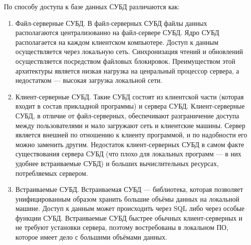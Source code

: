 \documentclass[12pt,a4paper,oneside]{article} %
\begin{document}
По способу доступа к базе данных СУБД различаются как:
\begin{enumerate}
\item  Файл-серверные СУБД. В файл-серверных СУБД файлы данных \linebreak
располагаются централизованно на файл-сервере СУБД. Ядро СУБД \linebreak
располагается на каждом клиентском компьютере. Доступ к данным \linebreak
осуществляется через локальную сеть. Синхронизация чтений и \linebreak
обновлений осуществляется посредством файловых блокировок. \linebreak
Преимуществом этой архитектуры является низкая нагрузка на \linebreak
ценральный процессор сервера, а недостатком — высокая загрузка \linebreak
локальной сети.

\item Клиент-серверные СУБД. Такие СУБД состоят из клиентской части \linebreak
(которая входит в состав прикладной программы) и сервера СУБД. \linebreak
Клиент-серверные СУБД, в отличие от файл-серверных, обеспечивают \linebreak
разграничение доступа между пользователями и мало загружают сеть \linebreak
и клиентские машины. Сервер является внешней по отношению к \linebreak
клиенту программой, и по надобности его можно заменить другим. \linebreak
Недостаток клиент-серверных СУБД в самом факте существования \linebreak
сервера СУБД (что плохо для локальных программ — в них удобнее \linebreak
встраиваемые СУБД) и больших вычислительных ресурсах, потребляемых сервером.

\item Встраиваемые СУБД. Встраиваемая СУБД — библиотека, которая \linebreak
позволяет унифицированным образом хранить большие объёмы данных \linebreak
на локальной машине. Доступ к данным может происходить через SQL \linebreak
либо через особые функции СУБД. Встраиваемые СУБД быстрее \linebreak
обычных клиент-серверных и не требуют установки сервера, \linebreak
поэтому востребованы в локальном ПО, которое имеет дело с \linebreak
большими объёмами данных.
\end{enumerate}
\end{document}
